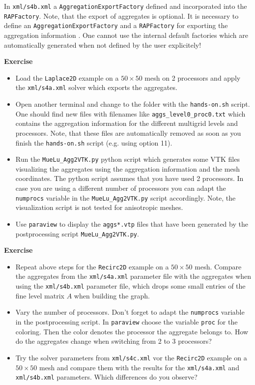\documentclass[12pt,a4paper]{article}
\begin{document}
In \verb|xml/s4b.xml| a \verb|AggregationExportFactory| defined and incorporated into the \verb|RAPFactory|. Note, that the export of aggregates is optional. It is necessary to define an \verb|AggregationExportFactory| and a \verb|RAPFactory| for exporting the aggregation information . One cannot use the internal default factories which are automatically generated when not defined by the user explicitely!

\begin{graybox}
 \textbf{Exercise}
 \begin{itemize}
  \item Load the \verb|Laplace2D| example on a $50\times 50$ mesh on 2 processors and apply the \verb|xml/s4a.xml| solver which exports the aggregates. 
  \item Open another terminal and change to the folder with the \verb|hands-on.sh| script. One should find new files with  filenames like \verb|aggs_level0_proc0.txt| which contains the aggregation information for the different multigrid levels and processors. Note, that these files are automatically removed as soon as you finish the \verb|hands-on.sh| script (e.g. using option 11).
  \item Run the \verb|MueLu_Agg2VTK.py| python script which generates some VTK files visualizing the aggregates using the aggregation information and the mesh coordinates. The python script assumes that you have used 2 processors. In case you are using a different number of processors you can adapt the \verb|numprocs| variable in the \verb|MueLu_Agg2VTK.py| script accordingly. Note, the visualization script is not tested for anisotropic meshes.
  \item Use \verb|paraview| to display the \verb|aggs*.vtp| files that have been generated by the postprocessing script \verb|MueLu_Agg2VTK.py|.
 \end{itemize}
\end{graybox}

\begin{graybox}
 \textbf{Exercise}
 \begin{itemize}
  \item Repeat above steps for the \verb|Recirc2D| example on a $50\times 50$ mesh. Compare the aggregates from the \verb|xml/s4a.xml| parameter file with the aggregates when using the \verb|xml/s4b.xml| parameter file, which drops some small entries of the fine level matrix $A$ when building the graph.
  \item Vary the number of processors. Don't forget to adapt the \verb|numprocs| variable in the postprocessing script. In \verb|paraview| choose the variable \verb|proc| for the coloring. Then the color denotes the processor the aggregate belongs to. How do the aggregates change when switching from 2 to 3 processors?
  \item Try the solver parameters from \verb|xml/s4c.xml| vor the \verb|Recirc2D| example on a $50\times 50$ mesh and compare them with the results for the \verb|xml/s4a.xml| and \verb|xml/s4b.xml| parameters. Which differences do you observe?
 \end{itemize}
\end{graybox}
\end{document}
